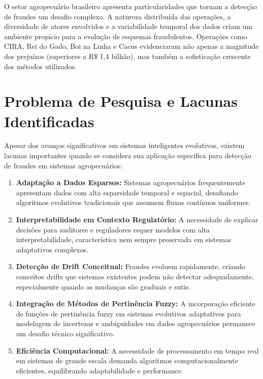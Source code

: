 O setor agropecuário brasileiro apresenta particularidades que tornam a detecção de fraudes um desafio complexo. A natureza distribuída das operações, a diversidade de atores envolvidos e a variabilidade temporal dos dados criam um ambiente propício para a evolução de esquemas fraudulentos. Operações como CIRA, Rei do Gado, Boi na Linha e Cacus evidenciaram não apenas a magnitude dos prejuízos (superiores a R\$ 1,4 bilhão), mas também a sofisticação crescente dos métodos utilizados.

\section{Problema de Pesquisa e Lacunas Identificadas}

Apesar dos avanços significativos em sistemas inteligentes evolutivos, existem lacunas importantes quando se considera sua aplicação específica para detecção de fraudes em sistemas agropecuários:

\begin{enumerate}
\item \textbf{Adaptação a Dados Esparsos:} Sistemas agropecuários frequentemente apresentam dados com alta esparsidade temporal e espacial, desafiando algoritmos evolutivos tradicionais que assumem fluxos contínuos uniformes.

\item \textbf{Interpretabilidade em Contexto Regulatório:} A necessidade de explicar decisões para auditores e reguladores requer modelos com alta interpretabilidade, característica nem sempre preservada em sistemas adaptativos complexos.

\item \textbf{Detecção de Drift Conceitual:} Fraudes evoluem rapidamente, criando conceitos drifts que sistemas existentes podem não detectar adequadamente, especialmente quando as mudanças são graduais e sutis.

\item \textbf{Integração de Métodos de Pertinência Fuzzy:} A incorporação eficiente de funções de pertinência fuzzy em sistemas evolutivos adaptativos para modelagem de incertezas e ambiguidades em dados agropecuários permanece um desafio técnico significativo.

\item \textbf{Eficiência Computacional:} A necessidade de processamento em tempo real em sistemas de grande escala demanda algoritmos computacionalmente eficientes, equilibrando adaptabilidade e performance.
\end{enumerate}

